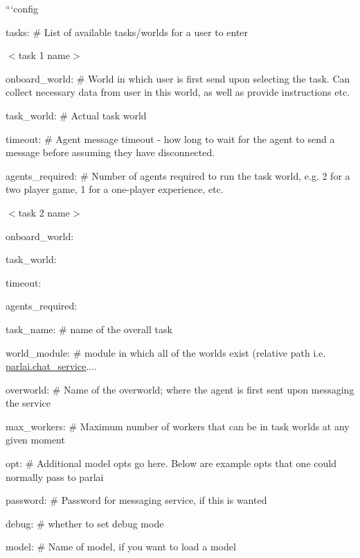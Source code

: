 ```config
\begin{DoxyItemize}
\item tasks\+: \# List of available tasks/worlds for a user to enter
\begin{DoxyItemize}
\item $<$task 1 name$>$
\begin{DoxyItemize}
\item onboard\+\_\+world\+: \# World in which user is first send upon selecting the task. Can collect necessary data from user in this world, as well as provide instructions etc.
\item task\+\_\+world\+: \# Actual task world
\item timeout\+: \# Agent message timeout -\/ how long to wait for the agent to send a message before assuming they have disconnected.
\item agents\+\_\+required\+: \# Number of agents required to run the task world, e.\+g. 2 for a two player game, 1 for a one-\/player experience, etc.
\end{DoxyItemize}
\item $<$task 2 name$>$
\begin{DoxyItemize}
\item onboard\+\_\+world\+:
\item task\+\_\+world\+:
\item timeout\+:
\item agents\+\_\+required\+:
\end{DoxyItemize}
\end{DoxyItemize}
\item task\+\_\+name\+: \# name of the overall task
\item world\+\_\+module\+: \# module in which all of the worlds exist (relative path i.\+e. {\ttfamily \hyperlink{namespaceparlai_1_1chat__service}{parlai.\+chat\+\_\+service}....}
\item overworld\+: \# Name of the overworld; where the agent is first sent upon messaging the service
\item max\+\_\+workers\+: \# Maximum number of workers that can be in task worlds at any given moment
\item opt\+: \# Additional model opts go here. Below are example opts that one could normally pass to parlai
\begin{DoxyItemize}
\item password\+: \# Password for messaging service, if this is wanted
\item debug\+: \# whether to set debug mode
\item model\+: \# Name of model, if you want to load a model

\end{DoxyItemize}
\end{DoxyItemize}
